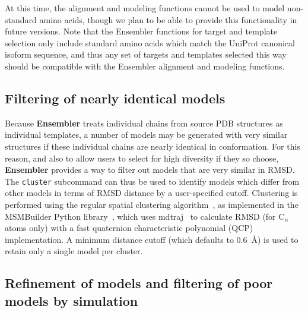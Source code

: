 \documentclass[aps,pre,twocolumn,nofootinbib,superscriptaddress,linenumbers]{revtex4-1}
\begin{document}
\color{red}
At this time, the alignment and modeling functions cannot be used to model non-standard amino acids, though we plan to be able to provide this functionality in future versions.
Note that the Ensembler functions for target and template selection only include standard amino acids which match the UniProt canonical isoform sequence, and thus any set of targets and templates selected this way should be compatible with the Ensembler alignment and modeling functions.
\color{black}

\subsection*{Filtering of nearly identical models}

Because {\bf Ensembler} treats individual chains from source PDB structures as individual templates, a number of models may be generated with very similar structures if these individual chains are nearly identical in conformation.
For this reason, and also to allow users to select for high diversity if they so choose, {\bf Ensembler} provides a way to filter out models that are very similar in RMSD.
The {\tt cluster} subcommand can thus be used to identify models which differ from other models in terms of RMSD distance by a user-specified cutoff.
Clustering is performed using the regular spatial clustering algorithm~\cite{noe:jcp:2011:msm-review}, as implemented in the MSMBuilder Python library~\cite{msmbuilder}, which uses mdtraj~\cite{mdtraj} to calculate RMSD (for C$_\alpha$ atoms only) with a fast quaternion characteristic polynomial (QCP)~\cite{theobald:acta-cryst-a:2005:qcp,theobald:j-comput-chem:2010:qcp,theobald:j-comput-chem:2011:qcp} implementation.
A minimum distance cutoff (which defaults to 0.6~\AA) is used to retain only a single model per cluster.

\color{red}
\subsection{Refinement of models and filtering of poor models by simulation}
\end{document}
